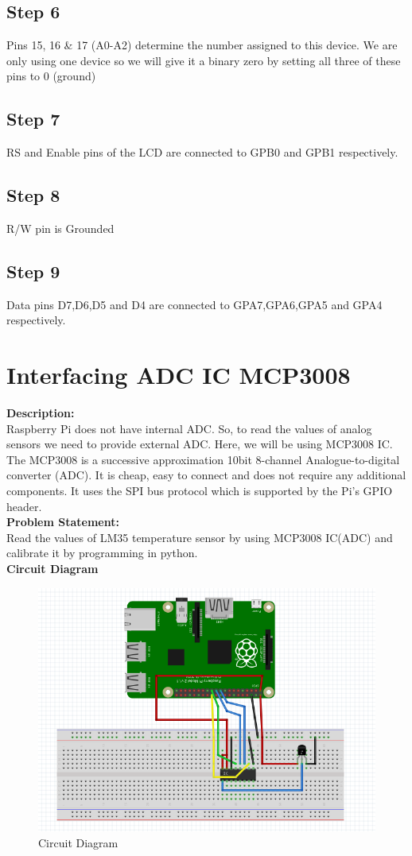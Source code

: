 \documentclass[a4paper,12pt,oneside]{book}
\begin{document}
\subsection*{Step 6}
Pins 15, 16 \& 17 (A0-A2) determine the number assigned to this device. We are only using one device so we will give it a binary zero by setting all three of these pins to 0 (ground)
\subsection*{Step 7}
RS and Enable pins of the LCD are connected to GPB0 and GPB1 respectively.
\subsection*{Step 8}
R/W pin is Grounded
\subsection*{Step 9}
Data pins D7,D6,D5 and D4 are connected to GPA7,GPA6,GPA5 and GPA4 respectively.

\section{Interfacing ADC IC MCP3008}
\textbf{Description:} \\
Raspberry Pi does not have internal ADC. So, to read the values of analog sensors 
we need to provide external ADC. Here, we will be using MCP3008 IC. 
The MCP3008 is a successive approximation 10bit 8-channel Analogue-to-digital 
converter (ADC). It is cheap, easy to connect and does not require any additional components. It uses the SPI bus protocol which is supported by the Pi's GPIO header.\\
\textbf{Problem Statement:} \\
Read the values of LM35 temperature sensor by using MCP3008 IC(ADC) and calibrate it by programming in python.  \\
\textbf{Circuit Diagram}\\
\begin{figure}[H]
    \centering
    \includegraphics[scale=0.4]{lm35_interfacing}
    \caption{Circuit Diagram}
\end{figure}
\end{document}
